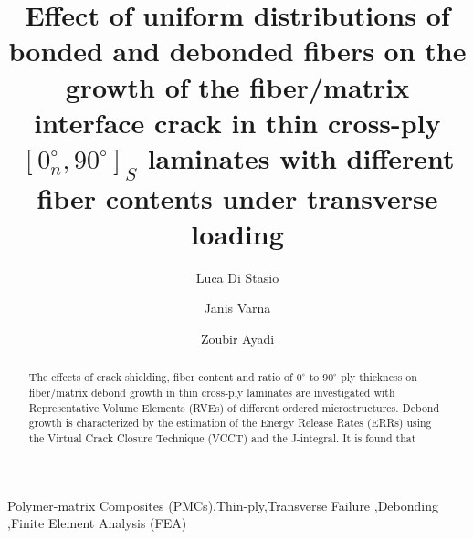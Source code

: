 \documentclass[review]{elsarticle}
\begin{document}
\begin{frontmatter}

\title{Effect of uniform distributions of bonded and debonded fibers on the growth of the fiber/matrix interface crack in thin cross-ply $\left[0^{\circ}_{n},90^{\circ}\right]_{S}$ laminates with different fiber contents under transverse loading}


\author[nancy,lulea]{Luca Di Stasio}
\author[lulea]{Janis Varna}
\author[nancy]{Zoubir Ayadi}


\address[nancy]{Universit\'e de Lorraine, EEIGM, IJL, 6 Rue Bastien Lepage, F-54010 Nancy, France}
\address[lulea]{Lule\aa\ University of Technology, University Campus, SE-97187 Lule\aa, Sweden}

\begin{abstract}
\noindent
The effects of crack shielding, fiber content and ratio of $0^{\circ}$ to $90^{\circ}$ ply thickness on fiber/matrix debond growth in thin cross-ply laminates are investigated with Representative Volume Elements (RVEs) of different ordered microstructures. Debond growth is characterized by the estimation of the Energy Release Rates (ERRs) using the Virtual Crack Closure Technique (VCCT) and the J-integral. It is found that 
\end{abstract}

\begin{keyword}
Polymer-matrix Composites (PMCs)\sep Thin-ply\sep Transverse Failure \sep Debonding \sep Finite Element Analysis (FEA)
\end{keyword}


\end{frontmatter}
\end{document}
